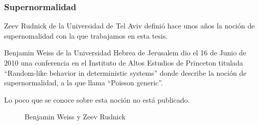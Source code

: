 \documentclass[10pt,mathserif]{beamer}%
\begin{document}
\begin{frame}
  \frametitle{Supernormalidad}
  Zeev Rudnick de la Universidad de Tel Aviv definió hace unos años la noción de supernomalidad con la que trabajamos en esta tesis.

  Benjamin Weiss de la Universidad Hebrea de Jerusalem dio el 16 de Junio de 2010 una conferencia en el Instituto de Altos Estudios de Princeton titulada “Random-like behavior in deterministic systems” donde describe la noción de supernormalidad, a la que llama “Poisson generic”.

  Lo poco que se conoce sobre esta noción no está publicado.

    \begin{figure}%
      \centering
      \qquad
      \caption{Benjamin Weiss y Zeev Rudnick}%
    \end{figure}
\end{frame}
\end{document}
